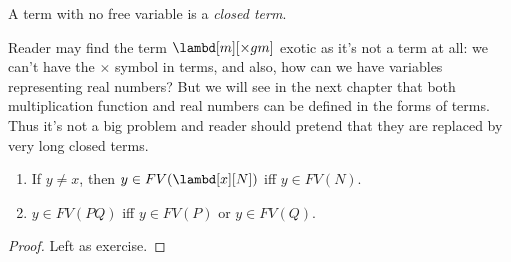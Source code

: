 \documentclass[../../../include/open-logic-section]{subfiles}
\begin{document}
\begin{defn}
  A term with no free variable is a \emph{closed term}.
\end{defn}

\begin{explain}
  Reader may find the term $\lambd[m][\times g m]$ exotic as it's not
  a term at all: we can't have the $\times$ symbol in terms, and also,
  how can we have variables representing real numbers? But we will see
  in the next chapter that both multiplication function and real
  numbers can be defined in the forms of terms. Thus it's not a big
  problem and reader should pretend that they are replaced by very
  long closed terms.
\end{explain}

\begin{lem}
  \begin{enumerate}
    \item {} If $y \neq x$, then $y \in FV(\lambd[x][N])$ iff $y \in
    FV(N)$.
    \item {} $y \in FV(PQ)$ iff $y \in FV(P)$ or
      $y \in FV(Q)$.
    \end{enumerate}
\end{lem}
\begin{proof}
  Left as exercise.
\end{proof}
\end{document}
